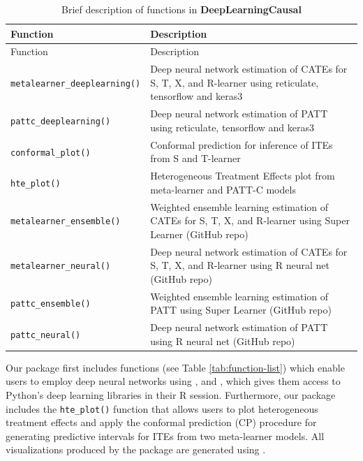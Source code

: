 \protect{}\label{tab:function-list}
\begin{longtable}[]{@{}
  >{\raggedright\arraybackslash}p{}
  >{\raggedright\arraybackslash}p{}@{}}
\caption{Brief description of functions in \textbf{DeepLearningCausal}}\tabularnewline
\toprule\noalign{}
\begin{minipage}[b]{\linewidth}\raggedright
Function
\end{minipage} & \begin{minipage}[b]{\linewidth}\raggedright
Description
\end{minipage} \\
\midrule\noalign{}
\endfirsthead
\toprule\noalign{}
\begin{minipage}[b]{\linewidth}\raggedright
Function
\end{minipage} & \begin{minipage}[b]{\linewidth}\raggedright
Description
\end{minipage} \\
\midrule\noalign{}
\endhead
\bottomrule\noalign{}
\endlastfoot
\texttt{metalearner\_deeplearning()} & Deep neural network estimation of CATEs for S, T, X, and R-learner using reticulate, tensorflow and keras3 \\
\texttt{pattc\_deeplearning()} & Deep neural network estimation of PATT using reticulate, tensorflow and keras3 \\
\texttt{conformal\_plot()} & Conformal prediction for inference of ITEs from S and T-learner \\
\texttt{hte\_plot()} & Heterogeneous Treatment Effects plot from meta-learner and PATT-C models \\
\texttt{metalearner\_ensemble()} & Weighted ensemble learning estimation of CATEs for S, T, X, and R-learner using Super Learner (GitHub repo) \\
\texttt{metalearner\_neural()} & Deep neural network estimation of CATEs for S, T, X, and R-learner using R neural net (GitHub repo) \\
\texttt{pattc\_ensemble()} & Weighted ensemble learning estimation of PATT using Super Learner (GitHub repo) \\
\texttt{pattc\_neural()} & Deep neural network estimation of PATT using R neural net (GitHub repo) \\
\end{longtable}

Our package first includes functions (see Table \ref{tab:function-list}) which enable users to employ deep
neural networks using ,  and
, which gives them access to Python's deep learning
libraries in their R session. Furthermore, our package includes the
\texttt{hte\_plot()} function that allows users to plot heterogeneous treatment
effects and apply the conformal prediction (CP) procedure for generating
predictive intervals for ITEs from two meta-learner models. All
visualizations produced by the package are generated using 
\citep{ggplot2}.

